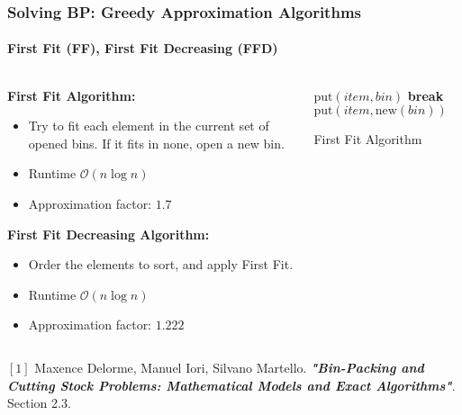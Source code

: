 \documentclass[10pt,    %
    english,            %
    xcolor=table,       %
    envcountsect,        %
    aspectratio=169     %
]{beamer}
\begin{document}
\begin{frame}
    \frametitle{Solving BP: Greedy Approximation Algorithms}
    \framesubtitle{First Fit (FF), First Fit Decreasing (FFD)}

    \begin{columns}
        \begin{column}{.45\textwidth}
            \textbf{First Fit Algorithm:}
            \begin{itemize}
                \item Try to fit each element in the current set of opened bins. If it fits in none, open a new bin.
                \item Runtime $\mathcal{O}(n \log n)$
                \item Approximation factor: $1.7$
            \end{itemize}
            \textbf{First Fit Decreasing Algorithm:}
            \begin{itemize}
                \item Order the elements to sort, and apply First Fit.
                \item Runtime $\mathcal{O}(n \log n)$
                \item Approximation factor: $1.222$
            \end{itemize}
        \end{column}
        \begin{column}{.45\textwidth}
            \begin{algorithm2e}[H]
                {
                    {
                        {
                            $\text{put}(item, bin)$\;
                            \textbf{break}\;
                        }
                    }
                    \Else
                    {
                        $\text{put}(item, \text{new}(bin))$\;
                    }
                }
                \caption{First Fit Algorithm}
            \end{algorithm2e}
        \end{column}
    \end{columns}

    \tiny
    \begin{description}
        \item $[1]$ Maxence Delorme, Manuel Iori, Silvano Martello. \textbf{\textit{"Bin-Packing and Cutting Stock Problems: Mathematical Models and Exact Algorithms"}}.  Section 2.3.
    \end{description}
\end{frame}
\end{document}
